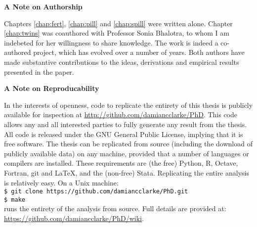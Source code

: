 \begin{center}
\textbf{A Note on Authorship}
\end{center}

Chapters \ref{chap:fert}, \ref{chap:pill} and \ref{chap:spill} were written 
alone.  Chapter \ref{chap:twins} was coauthored with Professor Sonia Bhalotra, 
to whom I am indebeted for her willingness to share knowledge.  The work is 
indeed a co-authored project, which has evolved over a number of years.  Both 
authors have made substantive contributions to the ideas, derivations and 
empirical results presented in the paper.


\begin{center}
\textbf{A Note on Reproducability}
\end{center}

\noindent In the interests of openness, code to replicate the entirety of this 
thesis is publicly available for inspection at 
\href{https://github.com/damiancclarke/PhD}{http://github.com/damiancclarke/PhD}. 
This code allows any and all interested 
parties to fully generate any result from the thesis.  All code is released 
under the GNU General Public License, implying that it is free software.  The 
thesis can be replicated from source (including the download of publicly 
available data) on any machine, provided that a number of languages or compilers 
are installed.  These requirements are (the free) Python, R, Octave, Fortran, 
git and LaTeX, and the (non-free) Stata.  Replicating the entire analysis is 
relatively easy.  On a Unix machine: 
\vspace{1mm} \\
\indent\texttt{\$ git clone https://github.com/damiancclarke/PhD.git}\\
\indent\texttt{\$ make}
\vspace{1mm} \\
runs the entirety of the analysis from source.  Full details are provided at: \\
\href{https://github.com/damiancclarke/PhD/wiki}{https://github.com/damiancclarke/PhD/wiki}. 
